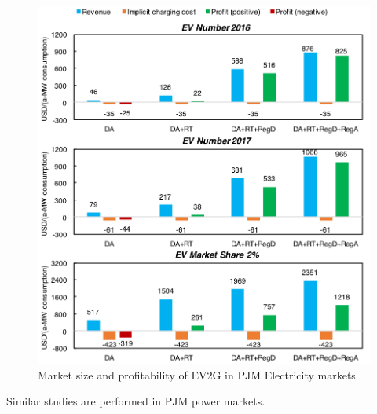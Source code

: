 \begin{figure}[h!]
	\centering
	\includegraphics[width=0.95\linewidth]{Figures/PJM_EV_profit}
	\caption{Market size and profitability of EV2G in PJM Electricity markets}
	\label{fig:PJM_EV}
\end{figure}

Similar studies are performed in PJM power markets. %



